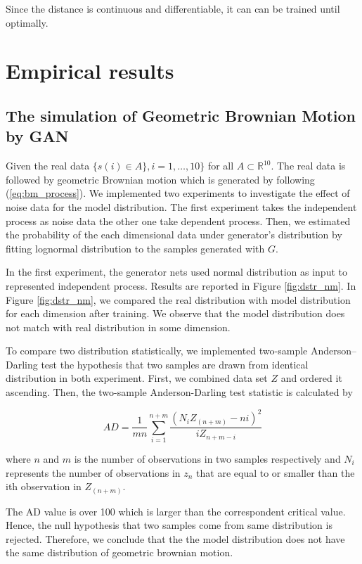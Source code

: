 \documentclass{article}
\begin{document}
	Since the distance is continuous and differentiable, it can can be trained until optimally. 
	
	
	\section{Empirical results}
	\subsection{The simulation of Geometric Brownian Motion by GAN}
	
	Given the real data $\{ s(i)\in A \}, i = 1, \dots, 10\}$ for all $A \subset \mathbb{R}^{10}$.
	The real data is followed by geometric Brownian motion which is generated by following (\ref{eq:bm_process}).
	 We implemented two experiments to investigate the effect of noise data for the model distribution.
	The first experiment takes the independent process as noise data the other one take dependent process.
	Then, we estimated the probability of the each dimensional data under generator’s distribution by fitting lognormal distribution to the samples generated with $G$. 
		
	In the first experiment, the generator nets used normal distribution as input to represented independent process.
	Results are reported in Figure \ref{fig:dstr_nm}. 
	In Figure \ref{fig:dstr_nm}, we compared the real distribution with model distribution for each dimension after training. 
	We observe that the model distribution does not match with real distribution in some dimension. 
	
	To compare two distribution statistically, we implemented two-sample Anderson–Darling test the hypothesis that two samples are drawn from identical distribution in both experiment.
	First, we combined data set $Z$ and ordered it ascending.
	Then, the two-sample Anderson-Darling test statistic is calculated by
	
	\begin{equation}
	AD = \frac{1}{mn}\sum_{i=1}^{n+m}\frac{(N_iZ_{(n+m)}-ni)^2}{iZ_{n+m-i}}
	\end{equation}
	
	where $n$ and $m$ is the number of observations in two samples respectively and $N_i$ represents the number of observations in $z_n$ that are equal to or smaller
	than the ith observation in $Z_{(n+m)}$. 
	
	The AD value is over 100 which is larger than the correspondent critical value.  
	Hence, the null hypothesis that two samples come from same distribution is rejected. 
	Therefore, we conclude that the the model distribution does not have the same distribution of geometric brownian motion.
	
\end{document}
